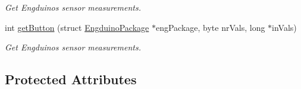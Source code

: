 \begin{DoxyCompactItemize}
\begin{DoxyCompactList}\small\item\em Get Engduino\textquotesingle{}s sensor measurements. \end{DoxyCompactList}\item 
int \hyperlink{group___engduino_protocol_gad53e6d5d3c390c3eca7f0456aa7a5d05}{get\+Button} (struct \hyperlink{struct_engduino_package}{Engduino\+Package} $\ast$eng\+Package, byte nr\+Vals, long $\ast$in\+Vals)
\begin{DoxyCompactList}\small\item\em Get Engduino\textquotesingle{}s sensor measurements. \end{DoxyCompactList}\end{DoxyCompactItemize}
\subsection*{Protected Attributes}
